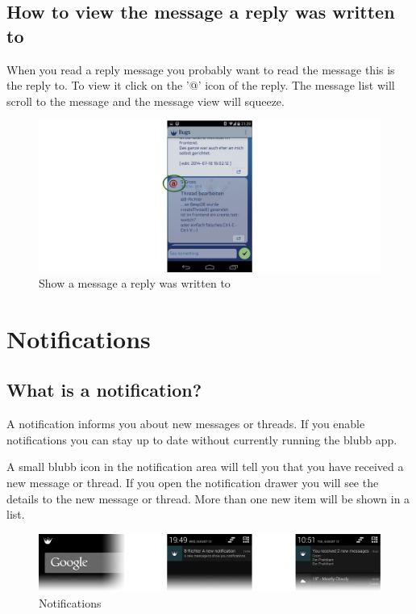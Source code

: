 \documentclass[12pt,a4paper,oneside]{report}
\begin{document}
\subsection{How to view the message a reply was written to}
When you read a reply message you probably want to read the message this is the reply to. To view it click on the '@' icon of the reply. The message list will scroll to the message and the message view will squeeze. 

\begin{figure}[!ht]
    \includegraphics[width=\linewidth]{ViewReply.png}
    \caption{Show a message a reply was written to}
\end{figure}

\section{Notifications}
\subsection{What is a notification?}
A notification informs you about new messages or threads. If you enable notifications you can stay up to date without currently running the blubb app. 

A small blubb icon in the notification area will tell you that you have received a new message or thread. If you open the notification drawer you will see the details to the new message or thread. More than one new item will be shown in a list.

\begin{figure}[!ht]
    \includegraphics[width=\linewidth]{Notification.png}
    \caption{Notifications}
\end{figure}
\end{document}
